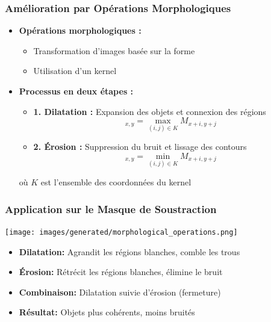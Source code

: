 \documentclass{beamer}
\begin{document}
\begin{frame}
    \frametitle{Amélioration par Opérations Morphologiques}
    \begin{itemize}
        \item \textbf{Opérations morphologiques :}
        \begin{itemize}
            \item Transformation d'images basée sur la forme
            \item Utilisation d'un kernel
        \end{itemize}
        \item \textbf{Processus en deux étapes :}
        \begin{itemize}
            \item \textbf{1. Dilatation :} Expansion des objets et connexion des régions
            \begin{equation*}
                [D(M)]_{x,y} = \max_{(i,j) \in K} M_{x+i,y+j}
            \end{equation*}
            \item \textbf{2. Érosion :} Suppression du bruit et lissage des contours
            \begin{equation*}
                [E(M)]_{x,y} = \min_{(i,j) \in K} M_{x+i,y+j}
            \end{equation*}
        \end{itemize}
        où \(K\) est l'ensemble des coordonnées du kernel
    \end{itemize}
\end{frame}

\begin{frame}
    \frametitle{Application sur le Masque de Soustraction}
    \begin{center}
        \texttt{[image: images/generated/morphological\_operations.png]}
    \end{center}
    \begin{itemize}
        \item \textbf{Dilatation:} Agrandit les régions blanches, comble les trous
        \item \textbf{Érosion:} Rétrécit les régions blanches, élimine le bruit
        \item \textbf{Combinaison:} Dilatation suivie d'érosion (fermeture)
        \item \textbf{Résultat:} Objets plus cohérents, moins bruités
    \end{itemize}
\end{frame}
\end{document}
